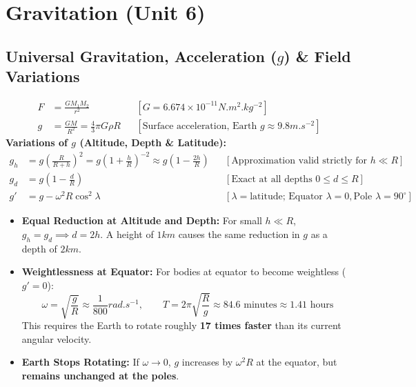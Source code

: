 \documentclass[11pt,a4paper]{article}
\begin{document}
\newpage

\section{Gravitation (Unit 6)}

\subsection{Universal Gravitation, Acceleration ($g$) \& Field Variations}

\begin{formulabox}
\begin{align}
  F &= \frac{G M_1 M_2}{r^2} && [G = 6.674\times 10^{-11}\si{N.m^2.kg^{-2}}] \\
  g &= \frac{GM}{R^2} = \frac{4}{3}\pi G \rho R && [\text{Surface acceleration, Earth } g \approx 9.8\si{m.s^{-2}}]
\end{align}
\textbf{Variations of $g$ (Altitude, Depth \& Latitude):}
\begin{align}
  g_h &= g\left(\frac{R}{R+h}\right)^2 = g\left(1 + \frac{h}{R}\right)^{-2} \approx g\left(1 - \frac{2h}{R}\right) && [\text{Approximation valid strictly for } h \ll R] \\
  g_d &= g\left(1 - \frac{d}{R}\right) && [\text{Exact at all depths } 0 \le d \le R] \\
  g' &= g - \omega^2 R \cos^2\lambda && [\lambda = \text{latitude; Equator } \lambda=0, \text{Pole } \lambda=90^\circ]
\end{align}
\end{formulabox}

\begin{usecasebox}
\begin{itemize}
  \item \textbf{Equal Reduction at Altitude and Depth:} For small $h \ll R$, $g_h = g_d \implies d = 2h$. A height of $1\si{km}$ causes the same reduction in $g$ as a depth of $2\si{km}$.
  \item \textbf{Weightlessness at Equator:} For bodies at equator to become weightless ($g'=0$):
  \begin{equation*}
    \omega = \sqrt{\frac{g}{R}} \approx \frac{1}{800}\si{rad.s^{-1}}, \qquad T = 2\pi\sqrt{\frac{R}{g}} \approx 84.6\text{ minutes} \approx 1.41\text{ hours}
  \end{equation*}
  This requires the Earth to rotate roughly \textbf{17 times faster} than its current angular velocity.
  \item \textbf{Earth Stops Rotating:} If $\omega \to 0$, $g$ increases by $\omega^2 R$ at the equator, but \textbf{remains unchanged at the poles}.
\end{itemize}
\end{usecasebox}
\end{document}
